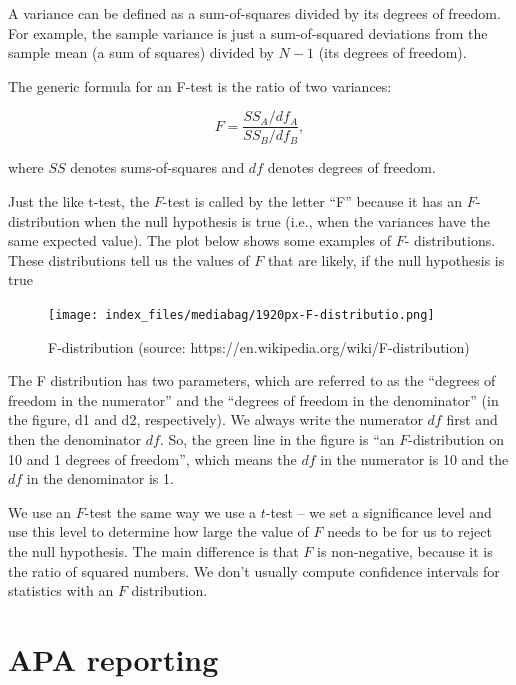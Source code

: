 \documentclass[
  letterpaper,
  DIV=11,
  numbers=noendperiod]{scrreprt}
\begin{document}
A variance can be defined as a sum-of-squares divided by its degrees of
freedom. For example, the sample variance is just a sum-of-squared
deviations from the sample mean (a sum of squares) divided by \(N - 1\)
(its degrees of freedom).

The generic formula for an F-test is the ratio of two variances:

\[F = \frac{SS_A / df_A}{SS_B / df_B}, \]

where \(SS\) denotes sums-of-squares and \(df\) denotes degrees of
freedom.

Just the like t-test, the \(F\)-test is called by the letter ``F''
because it has an \(F\)-distribution when the null hypothesis is true
(i.e., when the variances have the same expected value). The plot below
shows some examples of \(F\)- distributions. These distributions tell us
the values of \(F\) that are likely, if the null hypothesis is true

\begin{figure}

{\centering \texttt{[image: index\_files/mediabag/1920px-F-distributio.png]}

}

\caption{\label{fig-fdistribution}F-distribution (source:
https://en.wikipedia.org/wiki/F-distribution)}

\end{figure}

The F distribution has two parameters, which are referred to as the
``degrees of freedom in the numerator'' and the ``degrees of freedom in
the denominator'' (in the figure, d1 and d2, respectively). We always
write the numerator \(df\) first and then the denominator \(df\). So,
the green line in the figure is ``an \(F\)-distribution on 10 and 1
degrees of freedom'', which means the \(df\) in the numerator is 10 and
the \(df\) in the denominator is 1.

We use an \(F\)-test the same way we use a \(t\)-test -- we set a
significance level and use this level to determine how large the value
of \(F\) needs to be for us to reject the null hypothesis. The main
difference is that \(F\) is non-negative, because it is the ratio of
squared numbers. We don't usually compute confidence intervals for
statistics with an \(F\) distribution.

\hypertarget{apa-reporting}{%
\section{APA reporting}\label{apa-reporting}}
\end{document}
